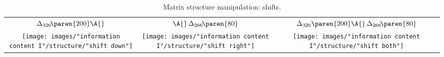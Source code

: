 \begin{table}[htdp]
\caption[Matrix structure manipulation: shifts]{Matrix structure manipulation: shifts.}
\begin{center}
\begin{tabular}{ccc}
%
  $\Delta_{326}\! \paren{200} \A{}$ & $\A{}\, \Delta_{266}\!\paren{80}$ & $\Delta_{326} \paren{200}\A{}\,\Delta_{266}\!\paren{80}$ \\[10pt]
%
  \texttt{[image: images/"information content I"/structure/"shift down"]} &
  \texttt{[image: images/"information content I"/structure/"shift right"]} &
  \texttt{[image: images/"information content I"/structure/"shift both"]} \\[30pt]
%
\end{tabular}
\end{center}
\label{tab:structure:basics:shift}
\end{table}

\endinput